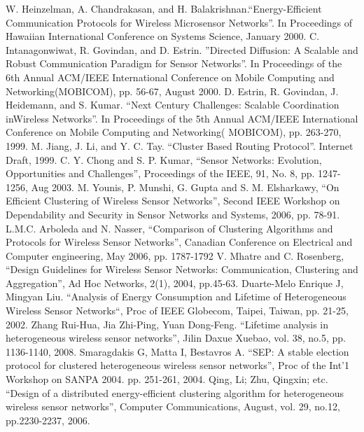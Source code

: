 \documentclass[10pt, conference, compsocconf]{IEEEtran}
\begin{document}
\begin{thebibliography}{1}

W. Heinzelman, A. Chandrakasan, and H. Balakrishnan.``Energy-Efficient Communication Protocols for Wireless Microsensor Networks''. In Proceedings of Hawaiian International Conference on Systems Science, January 2000.
C. Intanagonwiwat, R. Govindan, and D. Estrin. ''Directed Diffusion: A Scalable and Robust Communication Paradigm for Sensor Networks''. In Proceedings of the 6th Annual ACM/IEEE International Conference on Mobile Computing and Networking(MOBICOM), pp. 56-67, August 2000.
D. Estrin, R. Govindan, J. Heidemann, and S. Kumar. ``Next Century Challenges: Scalable Coordination inWireless Networks''. In Proceedings of the 5th Annual ACM/IEEE International Conference on Mobile Computing and Networking( MOBICOM), pp. 263-270, 1999.
M. Jiang, J. Li, and Y. C. Tay. ``Cluster Based Routing Protocol''. Internet Draft, 1999.
 C. Y. Chong and S. P. Kumar, ``Sensor Networks: Evolution, Opportunities and Challenges'', Proceedings of the IEEE, 91, No. 8, pp. 1247-1256, Aug 2003.
M. Younis, P. Munshi, G. Gupta and S. M. Elsharkawy, ``On Efficient Clustering of Wireless Sensor Networks'', Second IEEE Workshop on Dependability and Security in Sensor Networks and Systems, 2006, pp. 78-91.
L.M.C. Arboleda and N. Nasser, ``Comparison of Clustering Algorithms and Protocols for Wireless Sensor Networks'', Canadian Conference on Electrical and Computer engineering, May 2006, pp. 1787-1792
 V. Mhatre and C. Rosenberg, ``Design Guidelines for Wireless Sensor Networks: Communication, Clustering and Aggregation'', Ad Hoc Networks, 2(1), 2004, pp.45-63.
Duarte-Melo Enrique J, Mingyan Liu. ``Analysis of Energy Consumption and Lifetime of Heterogeneous Wireless Sensor Networks``, Proc of IEEE Globecom, Taipei, Taiwan, pp. 21-25, 2002.
Zhang Rui-Hua, Jia Zhi-Ping, Yuan Dong-Feng. ``Lifetime analysis in heterogeneous wireless sensor networks'', Jilin Daxue Xuebao, vol. 38, no.5, pp. 1136-1140, 2008.
 Smaragdakis G, Matta I, Bestavros A. ``SEP: A stable election protocol for clustered heterogeneous wireless sensor networks'', Proc of the Int'1 Workshop on SANPA 2004. pp. 251-261, 2004.
 Qing, Li; Zhu, Qingxin; etc. ``Design of a distributed energy-efficient clustering algorithm for heterogeneous wireless sensor networks'', Computer Communications, August, vol. 29, no.12, pp.2230-2237, 2006.

\end{thebibliography}
\end{document}
